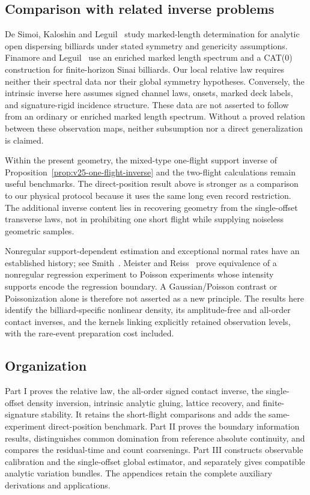 \subsection{Comparison with related inverse problems}

De Simoi, Kaloshin and Leguil~\cite{DSKL} study marked-length determination
for analytic open dispersing billiards under stated symmetry and genericity
assumptions.  Finamore and Leguil~\cite{FinamoreLeguil} use an enriched
marked length spectrum and a CAT(0) construction for finite-horizon Sinai
billiards.  Our local relative law requires neither their spectral data nor
their global symmetry hypotheses.  Conversely, the intrinsic inverse here
assumes signed channel laws, onsets, marked deck labels, and signature-rigid
incidence structure.  These data are not asserted to follow from an ordinary
or enriched marked length spectrum.  Without a proved relation between
these observation maps, neither subsumption nor a direct generalization
is claimed.

Within the present geometry, the mixed-type one-flight support inverse of
Proposition~\ref{prop:v25-one-flight-inverse} and the two-flight calculations
remain useful benchmarks.  The direct-position result above is stronger as
a comparison to our physical protocol because it uses the same long even
record restriction.  The additional inverse content lies in recovering
geometry from the single-offset transverse laws, not in prohibiting one
short flight while supplying noiseless geometric samples.

Nonregular support-dependent estimation and exceptional normal rates have
an established history; see Smith~\cite{Smith1985}.  Meister and
Reiss~\cite{MeisterReiss} prove equivalence of a nonregular regression
experiment to Poisson experiments whose intensity supports encode the
regression boundary.  A Gaussian/Poisson contrast or Poissonization alone
is therefore not asserted as a new principle.  The results here identify
the billiard-specific nonlinear density, its amplitude-free and all-order
contact inverses, and the kernels linking explicitly retained observation
levels, with the rare-event preparation cost included.

\subsection{Organization}

Part I proves the relative law, the all-order signed contact inverse, the
single-offset density inversion, intrinsic analytic gluing, lattice recovery,
and finite-signature stability.  It retains the short-flight comparisons
and adds the same-experiment direct-position benchmark.  Part II proves the
boundary information results, distinguishes common domination from reference
absolute continuity, and compares the residual-time and count coarsenings.
Part III constructs observable calibration and the single-offset global
estimator, and separately gives compatible analytic variation bundles.
The appendices retain the complete auxiliary derivations and applications.
